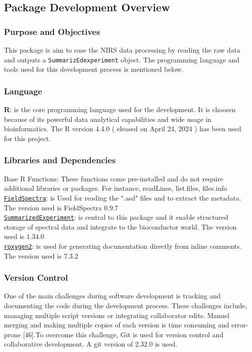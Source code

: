 \documentclass[12pt,a4paper]{report}
\begin{document}
\subsection{Package Development Overview}
\subsubsection*{Purpose and Objectives}
This package is aim to ease the NIRS data processing by reading the raw data and outputs a \texttt{SummarizEdexperiment} object. The programming language and tools used for this development process is mentioned below. \\

\subsubsection*{Language}
\textbf{R}: is the core programming language used for the development. It is choosen because of its powerful data analytical capabilities and wide usage in bioinformatics. The R version 4.4.0 ( eleased on April 24, 2024 ) has been used for this project.

\subsubsection*{Libraries and Dependencies}
Base R Functions: These functions come pre-installed and do not require additional libraries or packages. For instance, readLines, list.files, files.info \\
\texttt{\href{https://github.com/serbinsh/R-FieldSpectra}{FieldSpectra}}: is Used for reading the ".asd" files and to extract the metadata. The version used is FieldSpectra $0.9.7$\\
\texttt{\href{https://github.com/Bioconductor/SummarizedExperiment}{SummarizedExperiment}}: is central to this package and it enable structured storage of spectral data and integrate to the bioconductor world. The version used is $1.34.0$ \\
\texttt{\href{https://github.com/r-lib/roxygen2}{roxygen2}}: is used for generating documentation directly from inline comments. The version used is $7.3.2$ 

\subsubsection*{Version Control} 
One of the main challenges during software development is tracking and documenting the code during the development process. These challenges include, managing multiple script versions or integrating collaborator edits. Manuel merging and making multiple copies of each version is time consuming and error-prone [46].To overcome this challenge, Git is used for version control and collaborative development. A git version of $2.32.0$ is used.\\
\end{document}
